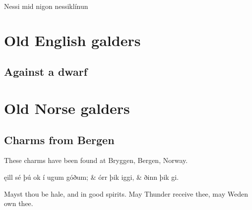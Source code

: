 Nessi mid nigon nessiklínun


\section{Old English galders}


\subsection{Against a dwarf}


\section{Old Norse galders}


\subsection{Charms from Bergen}

These charms have been found at Bryggen, Bergen, Norway.

\bvg
\bva[B380] ęill sé þú \hld ok í ugum góðum; &
\ind {}órr þik iggi, &
\ind {}ðinn þik gi.\eva

\bvb Mayst thou be hale, and in good spirits. May Thunder receive thee, may Weden own thee.\evb
\evg
